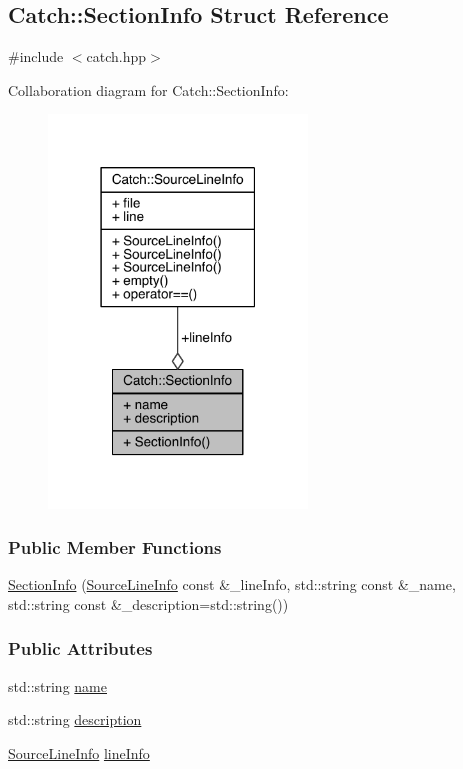 \hypertarget{a00073}{}\subsection{Catch\+:\+:Section\+Info Struct Reference}
\label{a00073}


{\ttfamily \#include $<$catch.\+hpp$>$}



Collaboration diagram for Catch\+:\+:Section\+Info\+:\nopagebreak
\begin{figure}[H]
\begin{center}
\leavevmode
\includegraphics[width=195pt]{a00263}
\end{center}
\end{figure}
\subsubsection*{Public Member Functions}
\begin{DoxyCompactItemize}
\item 
\hyperlink{a00073_a27aff3aaf8b6611f3651b17111a272c6}{Section\+Info} (\hyperlink{a00075}{Source\+Line\+Info} const \&\+\_\+line\+Info, std\+::string const \&\+\_\+name, std\+::string const \&\+\_\+description=std\+::string())
\end{DoxyCompactItemize}
\subsubsection*{Public Attributes}
\begin{DoxyCompactItemize}
\item 
std\+::string \hyperlink{a00073_a704c8fc662d309137e0d4f199cb7df58}{name}
\item 
std\+::string \hyperlink{a00073_a0052060219a6de74bb7ade34d4163a4e}{description}
\item 
\hyperlink{a00075}{Source\+Line\+Info} \hyperlink{a00073_adbc83b8a3507c4acc8ee249e93465711}{line\+Info}
\end{DoxyCompactItemize}


